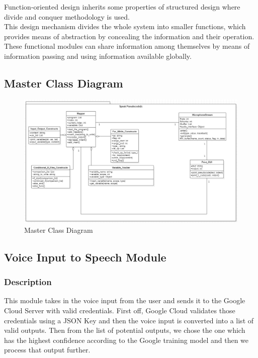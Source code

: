 \documentclass[12pt]{article}
\renewcommand{\thefigure}{\arabic{section}(\alph{figure})}
\renewcommand{\thefigure}{\arabic{section}.\arabic{subsection}(\alph{figure})}
\renewcommand{\thefigure}{\arabic{section}.\arabic{subsection}.\arabic{subsubsection}(\alph{figure})}
\begin{document}
Function-oriented design inherits some properties of structured design where divide and conquer methodology is used.\\

This design mechanism divides the whole system into smaller functions, which provides means of abstraction by concealing the information and their operation. These functional modules can share information among themselves by means of information passing and using information available globally.

\subsection{Master Class Diagram}
\renewcommand{\thefigure}{\arabic{section}.\arabic{subsection}}

\begin{figure}[H]
{\centering
\centerline{
    \includegraphics[width=\textwidth]{class_diagram.png}
}
\caption{Master Class Diagram}
}
\end{figure}

\subsection{Voice Input to Speech Module}

\subsubsection{Description}
This module takes in the voice input from the user and sends it to the Google Cloud Server with valid credentials. First off, Google Cloud validates those credentials using a JSON Key and then the voice input is converted into a list of valid outputs. Then from the list of potential outputs, we chose the one which has the highest confidence according to the Google training model and then we process that output further.
\end{document}
